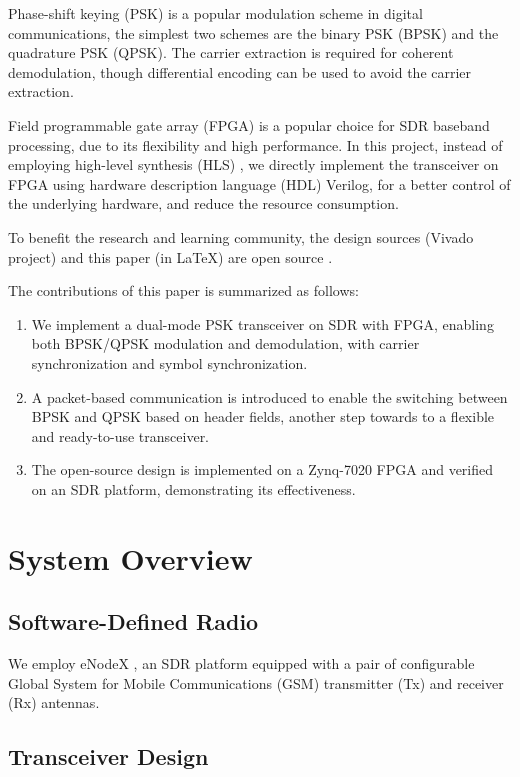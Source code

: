\documentclass[journal,twoside]{IEEEtran}
\begin{document}
    Phase-shift keying (PSK) is a popular modulation scheme in digital communications,
    the simplest two schemes are the binary PSK (BPSK) and the quadrature PSK (QPSK).
    The carrier extraction is required for coherent demodulation,
    though differential encoding can be used to avoid the carrier extraction.

    Field programmable gate array (FPGA) is a popular choice for SDR baseband processing,
    due to its flexibility and high performance.
    In this project,
    instead of employing high-level synthesis (HLS) \cite{zhao2023flexible},
    we directly implement the transceiver on FPGA using hardware description language (HDL) Verilog,
    for a better control of the underlying hardware, and reduce the resource consumption.

    To benefit the research and learning community,
    the design sources (Vivado project) and this paper (in \LaTeX) are open source \cite{github_repo}.
    
    The contributions of this paper is summarized as follows:
    \begin{enumerate}
      \item We implement a dual-mode PSK transceiver on SDR with FPGA, enabling both BPSK/QPSK modulation and demodulation,
      with carrier synchronization and symbol synchronization.
      \item A packet-based communication is introduced to enable the switching between BPSK and QPSK based on header fields,
      another step towards to a flexible and ready-to-use transceiver.
      \item The open-source design is implemented on a Zynq-7020 FPGA and verified on an SDR platform, demonstrating its effectiveness.
    \end{enumerate}

  \section{System Overview}

    \subsection{Software-Defined Radio}

      We employ eNodeX \cite{eNodeX}, an SDR platform equipped with a pair of
      configurable Global System for Mobile Communications (GSM) transmitter (Tx) and receiver (Rx) antennas.

    \subsection{Transceiver Design}
\end{document}
